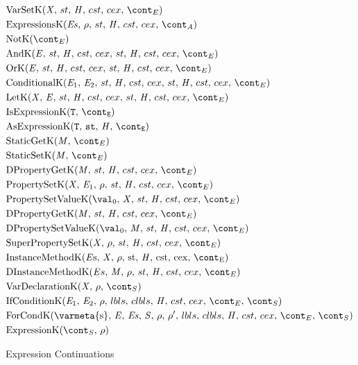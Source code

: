 \documentclass[a4paper,oneside]{article}
\begin{document}
\newcommand{\ForCondK}{\mathrm{ForCondK}(\mathrm{\varmeta{s}},\, \expressionmeta,\, \exprs,\, \statementmeta,\, \env,\, \env',\, \lbls,\, \clbls,\, \handler,\, \cstrace,\, \cex,\, \econt,\, \scont)}
\newcommand{\ExpressionK}[2]{\mathrm{ExpressionK}({#1},\,{#2})}
\begin{figure}[Htp]
  \begin{eqfigure}
  \begin{align}
    &\VarSetK{\idmeta}{\ExceptionHandlers}{\econt} \label{econt:varset}\\
    &\ExpressionsK{\exprs}{\env}{\acont} \label{econt:expressions}\\
    &\NotK{\econt} \label{econt:not}\\
    &\AndK{\expressionmeta}{\ExceptionHandlers}{\econt} \label{econt:and}\\
    &\OrK{\expressionmeta}{\ExceptionHandlers}{\econt} \label{econt:or}\\
    &\ConditionalK{\expressionmeta_1}{\expressionmeta_2}{\ExceptionHandlers}{\econt} \label{econt:cond}\\
    &\LetK{\idmeta}{\expressionmeta}{\ExceptionHandlers}{\econt} \label{econt:let}\\
    &\IsExpressionK \label{econt:is}\\
    &\AsExpressionK \label{econt:as}\\
    &\StaticGetK \label{econt:static-get}\\
    &\StaticSetK \label{econt:static-set}\\
    &\DPropertyGetK \label{econt:dproperty-get}\\
    &\PropertySetK \label{econt:property-set}\\
    &\PropertySetVK \label{econt:property-set}\\
    &\DPropertyGetK \label{econt:dproperty-set}\\
    &\DPropertySetVK \label{econt:dproperty-set-v}\\
    &\SuperPropertySetK \label{econt:super-property-set}\\
    &\InstanceMethodK{\strace} \label{econt:instance-method}\\
    &\DInstanceMethodK{\strace} \label{econt:dinstance-method}\\
    &\VarDeclK{\idmeta}{\env}{\scont} \label{econt:var-decl}\\
    &\IfCondK{\expressionmeta_1}{\expressionmeta_2} \label{econt:if-cond}\\
    &\ForCondK \label{econt:for-cond}\\
    &\ExpressionK{\scont}{\env} \label{econt:expression}
  \end{align}
  \caption{Expression Continuations}
  \label{figure:econts}
  \end{eqfigure}
\end{figure}
\end{document}
